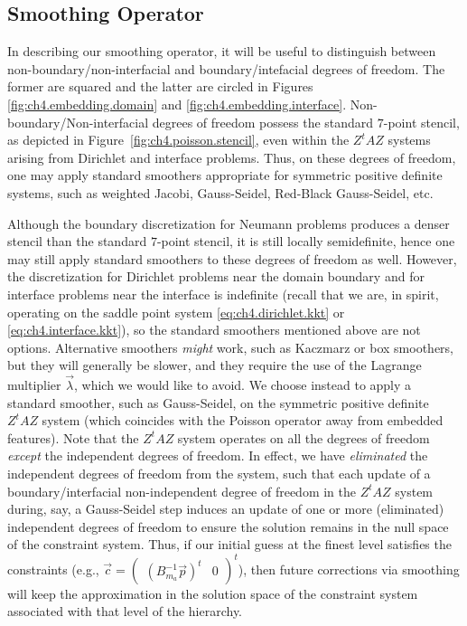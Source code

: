 \subsection{Smoothing Operator} \label{subsec:ch4.multigrid.smoothing}

In describing our smoothing operator, it will be useful to distinguish between non-boundary/\linebreak[0]non-interfacial and boundary/intefacial degrees of freedom. The former are squared and the latter are circled in Figures \ref{fig:ch4.embedding.domain} and \ref{fig:ch4.embedding.interface}. Non-boundary/Non-interfacial degrees of freedom possess the standard $7$-point stencil, as depicted in Figure~\ref{fig:ch4.poisson.stencil}, even within the $Z^tAZ$ systems arising from Dirichlet and interface problems. Thus, on these degrees of freedom, one may apply standard smoothers appropriate for symmetric positive definite systems, such as weighted Jacobi, Gauss-Seidel, Red-Black Gauss-Seidel, etc.

Although the boundary discretization for Neumann problems produces a denser stencil than the standard $7$-point stencil, it is still locally semidefinite, hence one may still apply standard smoothers to these degrees of freedom as well. However, the discretization for Dirichlet problems near the domain boundary and for interface problems near the interface is indefinite (recall that we are, in spirit, operating on the saddle point system \eqref{eq:ch4.dirichlet.kkt} or \eqref{eq:ch4.interface.kkt}), so the standard smoothers mentioned above are not options. Alternative smoothers \emph{might} work, such as Kaczmarz or box smoothers, but they will generally be slower, and they require the use of the Lagrange multiplier $\vec{\lambda}$, which we would like to avoid. We choose instead to apply a standard smoother, such as Gauss-Seidel, on the symmetric positive definite $Z^tAZ$ system (which coincides with the Poisson operator away from embedded features). Note that the $Z^tAZ$ system operates on all the degrees of freedom \emph{except} the independent degrees of freedom. In effect, we have \emph{eliminated} the independent degrees of freedom from the system, such that each update of a boundary/interfacial non-independent degree of freedom in the $Z^tAZ$ system during, say, a Gauss-Seidel step induces an update of one or more (eliminated) independent degrees of freedom to ensure the solution remains in the null space of the constraint system. Thus, if our initial guess at the finest level satisfies the constraints (e.g., $\vec{c} = \begin{pmatrix} (B_{m_a}^{-1} \vec{p})^t & 0 \end{pmatrix}^t$), then future corrections via smoothing will keep the approximation in the solution space of the constraint system associated with that level of the hierarchy.

